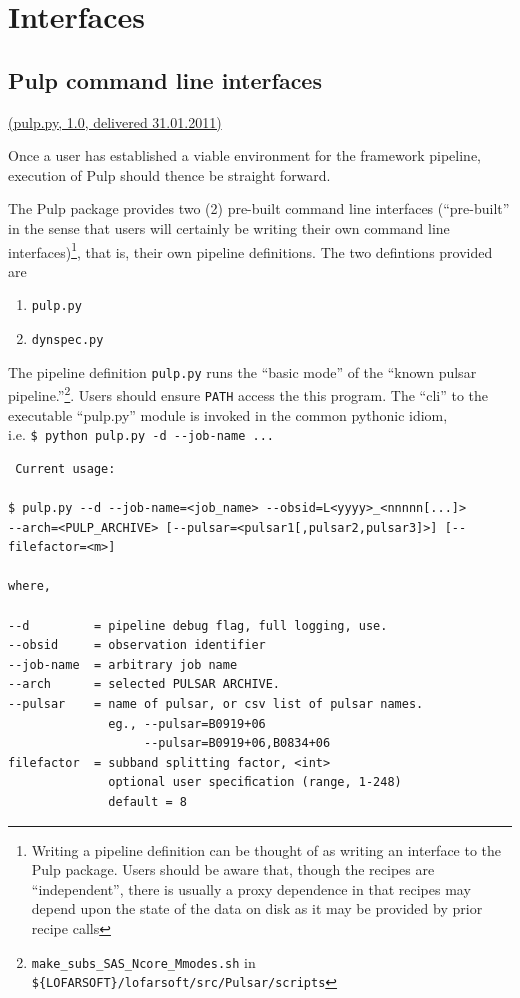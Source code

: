 \documentclass[a4paper,10pt,bibtotoc]{scrartcl}
\begin{document}
\section{Interfaces}
\label{sec:interfaces}
\subsection{Pulp command line interfaces}

\underline{(pulp.py, 1.0, delivered 31.01.2011)}

Once a user has established a viable environment for the framework pipeline, execution of Pulp should thence be straight forward.

The Pulp package provides two (2) pre-built command line interfaces
(``pre-built'' in the sense that users will certainly be writing their
own command line interfaces)\footnote{Writing a
pipeline definition can be thought of as writing an interface to the
Pulp package. Users should be aware that, though the recipes are
``independent'', there is usually a proxy dependence in that recipes
may depend upon the state of the data on disk as it may be provided by
prior recipe calls}, that is, their own pipeline definitions. The two
defintions provided are 
\begin{enumerate}
\item \verb|pulp.py|
\item \verb|dynspec.py|
\end{enumerate}

The pipeline definition \verb|pulp.py| runs the ``basic mode'' of the
``known pulsar pipeline.''\footnote{ \texttt{make\_subs\_SAS\_Ncore\_Mmodes.sh} in
\texttt{\$\{LOFARSOFT\}/lofarsoft/src/Pulsar/scripts}}. Users should
ensure \verb|PATH| access the this program. The ``cli'' to the
executable ``pulp.py'' module is invoked in the common pythonic idiom,\\

 i.e. \verb|$ python pulp.py -d --job-name ...|\\
\begin{verbatim}
 Current usage:

$ pulp.py --d --job-name=<job_name> --obsid=L<yyyy>_<nnnnn[...]>
--arch=<PULP_ARCHIVE> [--pulsar=<pulsar1[,pulsar2,pulsar3]>] [--filefactor=<m>]

where,

--d         = pipeline debug flag, full logging, use.
--obsid     = observation identifier          
--job-name  = arbitrary job name             
--arch      = selected PULSAR ARCHIVE.
--pulsar    = name of pulsar, or csv list of pulsar names.
              eg., --pulsar=B0919+06
                   --pulsar=B0919+06,B0834+06
filefactor  = subband splitting factor, <int>
              optional user speciﬁcation (range, 1-248)
              default = 8
\end{verbatim}
\end{document}
